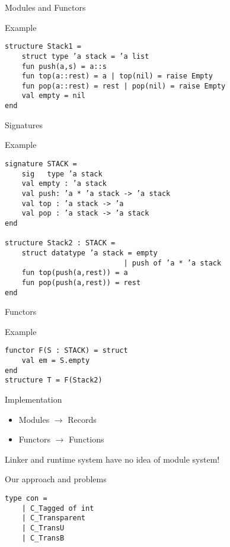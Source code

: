 \documentclass[presentation]{beamer}
\begin{document}
\begin{frame}[fragile]{Modules and Functors}
\begin{block}{Example}
\begin{verbatim}
structure Stack1 =
    struct type ’a stack = ’a list
    fun push(a,s) = a::s
    fun top(a::rest) = a | top(nil) = raise Empty
    fun pop(a::rest) = rest | pop(nil) = raise Empty
    val empty = nil
end
\end{verbatim}
\end{block}
\end{frame}

\begin{frame}[fragile]{Signatures}
  \begin{block}{Example}
\begin{verbatim}
signature STACK =
    sig   type ’a stack
    val empty : ’a stack
    val push: ’a * ’a stack -> ’a stack
    val top : ’a stack -> ’a
    val pop : ’a stack -> ’a stack
end

structure Stack2 : STACK =
    struct datatype ’a stack = empty
                            | push of ’a * ’a stack
    fun top(push(a,rest)) = a
    fun pop(push(a,rest)) = rest
end
\end{verbatim}
  \end{block}
\end{frame}

\begin{frame}[fragile]{Functors}
  \begin{block}{Example}
\begin{verbatim}
functor F(S : STACK) = struct  
    val em = S.empty
end
structure T = F(Stack2)
\end{verbatim}
  \end{block}
\end{frame}

\begin{frame}{Implementation}
  \begin{itemize}
\item{Modules $\rightarrow$ Records}
\item{Functors $\rightarrow$ Functions}
\end{itemize}
Linker and runtime system have no idea of module system!
\end{frame}

\begin{frame}[fragile]{Our approach and problems}
 \begin{verbatim}
type con =
    | C_Tagged of int
    | C_Transparent
    | C_TransU
    | C_TransB
\end{verbatim}
\end{frame}
\end{document}
